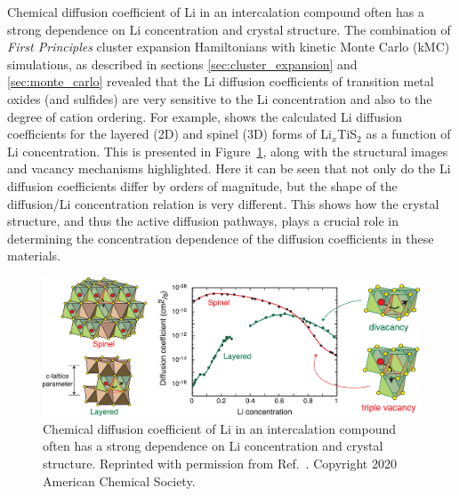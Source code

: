 \documentclass[../main.tex]{subfiles}
\begin{document}
Chemical diffusion coefficient of Li in an intercalation compound often has a strong dependence on Li concentration and crystal structure. The combination of \textit{First Principles} cluster expansion Hamiltonians with kinetic Monte Carlo (kMC) simulations, as described in sections \ref{sec:cluster_expansion} and \ref{sec:monte_carlo} revealed that the Li diffusion coefficients of transition metal oxides (and sulfides) are very sensitive to the Li concentration and also to the degree of cation ordering. \cite{van2008nondilute,VanderVen2001, bhattacharya2011first, bhattacharya2010phase, VanDerVen2013} For example, \citeauthor{VanderVen2020} shows the calculated Li diffusion coefficients for the layered (2D) and spinel (3D) forms of Li$_x$TiS$_2$ as a function of Li concentration. \cite{VanderVen2020,VanDerVen2013,van2008nondilute,bhattacharya2011first} This is presented in Figure~\ref{fig:LixTiS2_diffusion}, along with the structural images and vacancy mechanisms highlighted. Here it can be seen that not only do the Li diffusion coefficients differ by orders of magnitude, but the shape of the diffusion/Li concentration relation is very different. This shows how the crystal structure, and thus the active diffusion pathways, plays a crucial role in determining the concentration dependence of the diffusion coefficients in these materials.

\begin{figure}
    \centering
    \includegraphics[scale=0.26]{figures/LixTiS2_diffusion.jpeg}
    \caption{Chemical diffusion coefficient of Li in an intercalation compound often has a strong dependence on Li concentration and crystal structure. Reprinted with permission from Ref.~. Copyright 2020 American Chemical Society.}
    \label{fig:LixTiS2_diffusion}
\end{figure}
\end{document}
